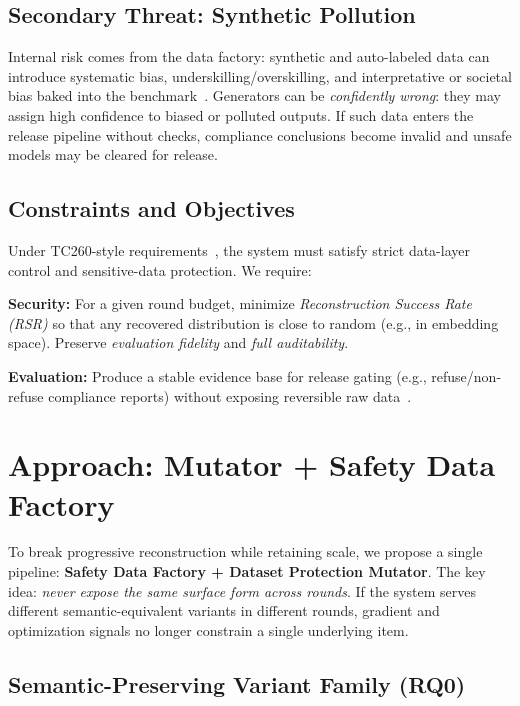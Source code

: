\documentclass[letterpaper,twocolumn,10pt]{article}
\begin{document}
\subsection{Secondary Threat: Synthetic Pollution}

Internal risk comes from the data factory: synthetic and auto-labeled data can introduce systematic bias, underskilling/overskilling, and interpretative or societal bias baked into the benchmark~\cite{synthetic-bias-ml,bias-synthetic-review}. Generators can be \emph{confidently wrong}: they may assign high confidence to biased or polluted outputs. If such data enters the release pipeline without checks, compliance conclusions become invalid and unsafe models may be cleared for release.

\subsection{Constraints and Objectives}

Under TC260-style requirements~\cite{tc260-governance}, the system must satisfy strict data-layer control and sensitive-data protection. We require:

\textbf{Security:} For a given round budget, minimize \emph{Reconstruction Success Rate (RSR)} so that any recovered distribution is close to random (e.g., in embedding space). Preserve \emph{evaluation fidelity} and \emph{full auditability}.

\textbf{Evaluation:} Produce a stable evidence base for release gating (e.g., refuse/non-refuse compliance reports) without exposing reversible raw data~\cite{dual-use-attestations}.

\section{Approach: Mutator + Safety Data Factory}
\label{sec:approach}

To break progressive reconstruction while retaining scale, we propose a single pipeline: \textbf{Safety Data Factory + Dataset Protection Mutator}. The key idea: \emph{never expose the same surface form across rounds}. If the system serves different semantic-equivalent variants in different rounds, gradient and optimization signals no longer constrain a single underlying item.

\subsection{Semantic-Preserving Variant Family (RQ0)}
\end{document}
